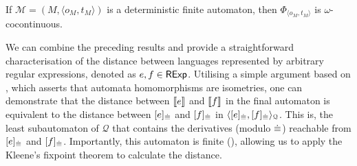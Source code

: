 \begin{corollary}\label{c2:lem:cocontinuous} If $\mathcal{M} = (M, \langle o_M, t_M\rangle) $ is a deterministic finite automaton, then $\Phi_{\langle o_M, t_M\rangle}$ is $\omega$-cocontinuous.\end{corollary}
We can combine the preceding results and provide a straightforward characterisation of the distance between languages represented by arbitrary regular expressions, denoted as $e, f \in \mathsf{RExp}$. Utilising a simple argument based on , which asserts that automata homomorphisms are isometries, one can demonstrate that the distance between $\left\llbracket{e}\right\rrbracket$ and $\left\llbracket{f}\right\rrbracket$ in the final automaton is equivalent to the distance between $[e]_{{\mathrel{\dot\equiv}}}$ and $[f]_{{\mathrel{\dot\equiv}}}$ in $\langle [e]_{{\mathrel{\dot\equiv}}},[f]_{{\mathrel{\dot\equiv}}} \rangle_{\mathcal{Q}}$. This is, the least subautomaton of $\mathcal{Q}$ that contains the derivatives (modulo ${\mathrel{\dot\equiv}}$) reachable from $[e]_{{\mathrel{\dot\equiv}}}$ and $[f]_{{\mathrel{\dot\equiv}}}$. Importantly, this automaton is finite (), allowing us to apply the Kleene's fixpoint theorem to calculate the distance.

